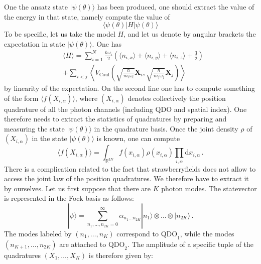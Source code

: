 \documentclass[reprint, amsmath, amssymb, aps]{revtex4-2}
\begin{document}
    One the ansatz state $|\psi(\theta)\rangle$ has been produced, one should extract the value of the energy in that state, namely compute the value of
    \begin{equation}
        \langle\psi(\theta)|H|\psi(\theta)\rangle
    \end{equation}
    To be specific, let us take the model $H$, and let us denote by angular brackets the expectation in state $|\psi(\theta)\rangle$. One has
    \begin{equation}
    \label{eq:loss}
    \begin{split}
        &\langle H\rangle = \sum_{i=1}^N\frac{\hbar\omega_i}{2}\left(\langle n_{i,x}\rangle+\langle n_{i,y}\rangle+\langle n_{i,z}\rangle+\frac{3}{2}\right)\\
        &+ \sum_{i<j}\left\langle V_\text{Coul}\left(\sqrt{\frac{\hbar}{m_i\omega_i}}\bm X_i, \sqrt{\frac{\hbar}{m_j\omega_j}}\bm X_j\right)\right\rangle
    \end{split}
    \end{equation}
    by linearity of the expectation. On the second line one has to compute something of the form $\langle f(X_{i,\alpha})\rangle$, where $(X_{i,\alpha})$ denotes collectively the position quadrature of all the photon channels (including QDO and spatial index). One therefore needs to extract the statistics of quadratures by preparing and measuring the state $|\psi(\theta)\rangle$ in the quadrature basis. Once the joint density $\rho$ of $(X_{i,\alpha})$ in the state $|\psi(\theta)\rangle$ is known, one can compute
    \begin{equation}
        \langle f(X_{i,\alpha})\rangle = \int_{\mathbb R^{3N}}f(x_{i,\alpha})\rho(x_{i,\alpha})\prod_{i,\alpha}\text{d}x_{i,\alpha}\,.
    \end{equation}
    There is a complication related to the fact that strawberryfields does not allow to access the joint law of the position quadratures. We therefore have to extract it by ourselves. Let us first suppose that there are $K$ photon modes. The statevector is represented in the Fock basis as follows:
    \begin{equation}
        |\psi\rangle = \sum_{n_1,\dots,n_{2K}=0}^\infty \alpha_{n_1\dots n_{2K}}|n_1\rangle\otimes\dots\otimes|n_{2K}\rangle\,.
    \end{equation}
    The modes labeled by $(n_1,\dots,n_K)$ correspond to $\text{QDO}_1$, while the modes $(n_{K+1},\dots,n_{2K})$ are attached to $\text{QDO}_2$.
    The amplitude of a specific tuple of the quadratures $(X_1,\dots, X_{K})$ is therefore given by:
\end{document}
